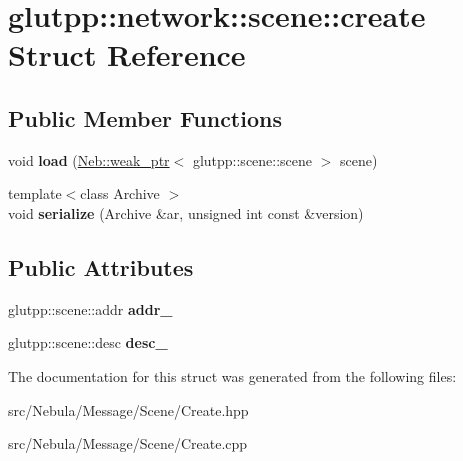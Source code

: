 \hypertarget{structglutpp_1_1network_1_1scene_1_1create}{\section{glutpp\-:\-:network\-:\-:scene\-:\-:create \-Struct \-Reference}
\label{structglutpp_1_1network_1_1scene_1_1create}
}
\subsection*{\-Public \-Member \-Functions}
\begin{DoxyCompactItemize}
\item 
\hypertarget{structglutpp_1_1network_1_1scene_1_1create_ab8c8e0a44dbfb5682375a1f587120275}{void {\bfseries load} (\hyperlink{classNeb_1_1weak__ptr}{\-Neb\-::weak\-\_\-ptr}$<$ glutpp\-::scene\-::scene $>$ scene)}\label{structglutpp_1_1network_1_1scene_1_1create_ab8c8e0a44dbfb5682375a1f587120275}

\item 
\hypertarget{structglutpp_1_1network_1_1scene_1_1create_a17f38bf631168fcfdd88f301917339c8}{{\footnotesize template$<$class Archive $>$ }\\void {\bfseries serialize} (\-Archive \&ar, unsigned int const \&version)}\label{structglutpp_1_1network_1_1scene_1_1create_a17f38bf631168fcfdd88f301917339c8}

\end{DoxyCompactItemize}
\subsection*{\-Public \-Attributes}
\begin{DoxyCompactItemize}
\item 
\hypertarget{structglutpp_1_1network_1_1scene_1_1create_a56b5904bc6785c68e7e85ef5ddf27bee}{glutpp\-::scene\-::addr {\bfseries addr\-\_\-}}\label{structglutpp_1_1network_1_1scene_1_1create_a56b5904bc6785c68e7e85ef5ddf27bee}

\item 
\hypertarget{structglutpp_1_1network_1_1scene_1_1create_a43f9f4c58b0310c0eeb41cb057f74958}{glutpp\-::scene\-::desc {\bfseries desc\-\_\-}}\label{structglutpp_1_1network_1_1scene_1_1create_a43f9f4c58b0310c0eeb41cb057f74958}

\end{DoxyCompactItemize}


\-The documentation for this struct was generated from the following files\-:\begin{DoxyCompactItemize}
\item 
src/\-Nebula/\-Message/\-Scene/\-Create.\-hpp\item 
src/\-Nebula/\-Message/\-Scene/\-Create.\-cpp\end{DoxyCompactItemize}
